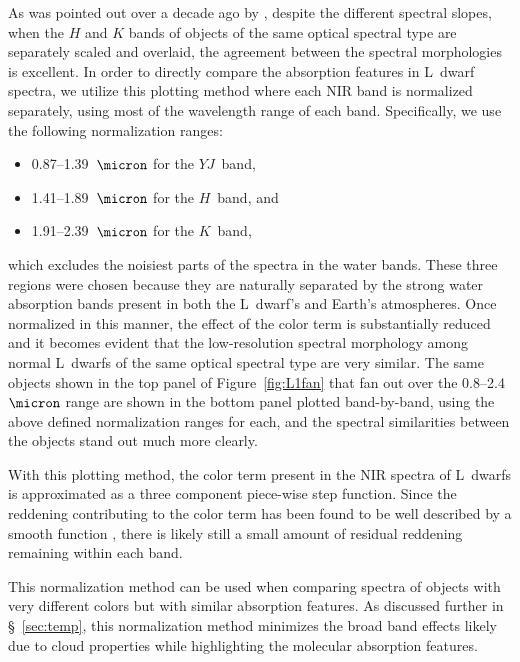 \documentclass[12pt,preprint]{aastex}
\begin{document}
As was pointed out over a decade ago by \citet{Leggett:2003tm}, despite the different spectral slopes, when the $H$ and $K$ bands of objects of the same optical spectral type are separately scaled and overlaid, the agreement between the spectral morphologies is excellent.
In order to directly compare the absorption features in L~dwarf spectra, we utilize this plotting method where each NIR band is normalized separately, using most of the wavelength range of each band. 
Specifically, we use the following normalization ranges: 
\begin{itemize} \itemsep1pt \parskip0pt 
\item 0.87--1.39~$\micron$ for the $YJ$~band,
\item 1.41--1.89~$\micron$ for the $H$~band, and 
\item 1.91--2.39~$\micron$ for the $K$~band, 
\end{itemize}
which excludes the noisiest parts of the spectra in the water bands.
These three regions were chosen because they are naturally separated by the strong water absorption bands present in both the L~dwarf's and Earth's atmospheres. 
Once normalized in this manner, the effect of the color term is substantially reduced and it becomes evident that the low-resolution spectral morphology among normal L~dwarfs of the same optical spectral type are very similar. 
The same objects shown in the top panel of Figure~\ref{fig:L1fan} that fan out over the 0.8--2.4~$\micron$ range are shown in the bottom panel plotted band-by-band, using the above defined normalization ranges for each, and the spectral similarities between the objects stand out much more clearly.

With this plotting method, the color term present in the NIR spectra of L~dwarfs is approximated as a three component piece-wise step function. Since the reddening contributing to the color term has been found to be well described by a smooth function \citep{Hiranaka13,Marocco:2014kr}, there is likely still a small amount of residual reddening remaining within each band.

This normalization method can be used when comparing spectra of objects with very different colors but with similar absorption features. As discussed further in \S~\ref{sec:temp}, this normalization method minimizes the broad band effects likely due to cloud properties while highlighting the molecular absorption features. 
\end{document}
